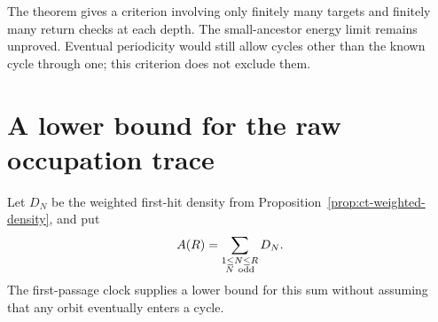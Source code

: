 \documentclass[11pt,a4paper]{article}
\begin{document}
The theorem gives a criterion involving only finitely many targets
and finitely many return checks at each depth. The small-ancestor
energy limit remains unproved. Eventual periodicity would still
allow cycles other than the known cycle through one; this criterion
does not exclude them.


\section{A lower bound for the raw occupation trace}
\label{sec:ct-raw-occupation}

Let \(D_N\) be the weighted first-hit density from
Proposition~\ref{prop:ct-weighted-density}, and put
\[
 A(R)=\sum_{\substack{1\le N\le R\\N\ {\rm odd}}}D_N.
\]
The first-passage clock supplies a lower bound for this sum without
assuming that any orbit eventually enters a cycle.
\end{document}
